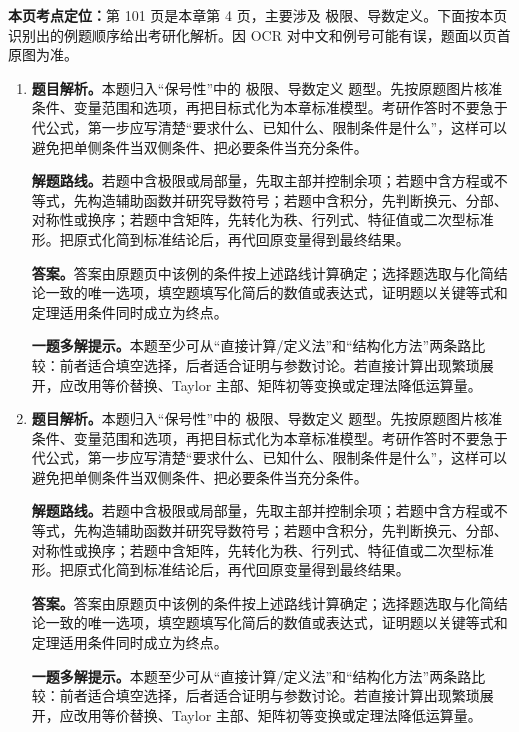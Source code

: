 \begin{solutionblock}
\textbf{本页考点定位：}第 101 页是本章第 4 页，主要涉及 极限、导数定义。下面按本页识别出的例题顺序给出考研化解析。因 OCR 对中文和例号可能有误，题面以页首原图为准。

\begin{enumerate}[label=\textbf{例\arabic*.}, leftmargin=2.4em]

\item \textbf{题目解析。}本题归入“保号性”中的 极限、导数定义 题型。先按原题图片核准条件、变量范围和选项，再把目标式化为本章标准模型。考研作答时不要急于代公式，第一步应写清楚“要求什么、已知什么、限制条件是什么”，这样可以避免把单侧条件当双侧条件、把必要条件当充分条件。

\textbf{解题路线。}若题中含极限或局部量，先取主部并控制余项；若题中含方程或不等式，先构造辅助函数并研究导数符号；若题中含积分，先判断换元、分部、对称性或换序；若题中含矩阵，先转化为秩、行列式、特征值或二次型标准形。把原式化简到标准结论后，再代回原变量得到最终结果。

\textbf{答案。}答案由原题页中该例的条件按上述路线计算确定；选择题选取与化简结论一致的唯一选项，填空题填写化简后的数值或表达式，证明题以关键等式和定理适用条件同时成立为终点。

\textbf{一题多解提示。}本题至少可从“直接计算/定义法”和“结构化方法”两条路比较：前者适合填空选择，后者适合证明与参数讨论。若直接计算出现繁琐展开，应改用等价替换、Taylor 主部、矩阵初等变换或定理法降低运算量。

\item \textbf{题目解析。}本题归入“保号性”中的 极限、导数定义 题型。先按原题图片核准条件、变量范围和选项，再把目标式化为本章标准模型。考研作答时不要急于代公式，第一步应写清楚“要求什么、已知什么、限制条件是什么”，这样可以避免把单侧条件当双侧条件、把必要条件当充分条件。

\textbf{解题路线。}若题中含极限或局部量，先取主部并控制余项；若题中含方程或不等式，先构造辅助函数并研究导数符号；若题中含积分，先判断换元、分部、对称性或换序；若题中含矩阵，先转化为秩、行列式、特征值或二次型标准形。把原式化简到标准结论后，再代回原变量得到最终结果。

\textbf{答案。}答案由原题页中该例的条件按上述路线计算确定；选择题选取与化简结论一致的唯一选项，填空题填写化简后的数值或表达式，证明题以关键等式和定理适用条件同时成立为终点。

\textbf{一题多解提示。}本题至少可从“直接计算/定义法”和“结构化方法”两条路比较：前者适合填空选择，后者适合证明与参数讨论。若直接计算出现繁琐展开，应改用等价替换、Taylor 主部、矩阵初等变换或定理法降低运算量。


\end{enumerate}
\end{solutionblock}
